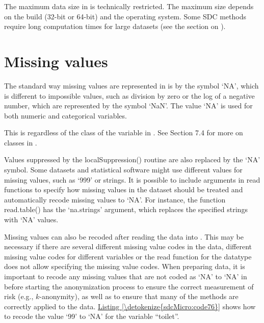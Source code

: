 \documentclass[letterpaper,10pt,english]{sphinxmanual}
\begin{document}
The maximum data size in  is technically restricted. The maximum size
depends on the  build (32-bit or 64-bit) and the operating system.
Some SDC methods require long computation times for large datasets (see the section
on {\hyperref[\detokenize{sdcMicro:computation-time}]{}}).


\section{Missing values}
\label{\detokenize{sdcMicro:missing-values}}
The standard way missing values are represented in  is by the symbol
‘NA’, which is different to impossible values, such as division by zero
or the log of a negative number, which are represented by the symbol
‘NaN’. The value ‘NA’ is used for both numeric and categorical
variables. %
\begin{footnote}[6]\sphinxAtStartFootnote
This is regardless of the class of the variable in . See Section
7.4 for more on classes in .
%
\end{footnote} Values suppressed by the
localSuppression() routine are also replaced by the ‘NA’ symbol. Some
datasets and statistical software might use different values for missing
values, such as ‘999’ or strings. It is possible to include arguments in
read functions to specify how missing values in the dataset should be
treated and automatically recode missing values to ‘NA’. For instance,
the function read.table() has the ‘na.strings’ argument, which replaces
the specified strings with ‘NA’ values.

Missing values can also be recoded after reading the data into . This
may be necessary if there are several different missing value codes in
the data, different missing value codes for different variables or the
read function for the datatype does not allow specifying the missing
value codes. When preparing data, it is important to recode any missing
values that are not coded as ‘NA’ to ‘NA’ in  before starting the
anonymization process to ensure the correct measurement of risk (e.g.,
\(k\)-anonymity), as well as to ensure that many of the methods are
correctly applied to the data. \hyperref[\detokenize{sdcMicro:code76}]{Listing \ref{\detokenize{sdcMicro:code76}}} shows how to recode the value
‘99’ to ‘NA’ for the variable “toilet”.

\def\sphinxLiteralBlockLabel{\label{\detokenize{sdcMicro:code76}}}
%
\begin{sphinxVerbatim}[commandchars=\\\{\},numbers=left,firstnumber=1,stepnumber=1]
     \PYG{p}{[}\PYG{p}{[}\PYG{p}{]}  \PYG{p}{]}  
\end{sphinxVerbatim}
\end{document}
